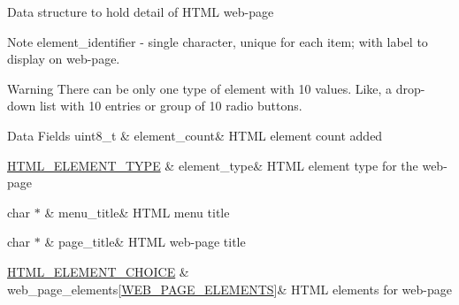 Data structure to hold detail of H\+T\+ML web-\/page \begin{DoxyNote}{Note}
element\+\_\+identifier -\/ single character, unique for each item; with label to display on web-\/page. 
\end{DoxyNote}
\begin{DoxyWarning}{Warning}
There can be only one type of element with 10 values. Like, a drop-\/down list with 10 entries or group of 10 radio buttons. 
\end{DoxyWarning}
\begin{DoxyFields}{Data Fields}
uint8\+\_\+t\hypertarget{group__wireless__interface_ab6b91b79e0ba83629806da526e4bdaae}{}\label{group__wireless__interface_ab6b91b79e0ba83629806da526e4bdaae}
&
element\+\_\+count&
H\+T\+ML element count added \\
\hline

\hyperlink{group__wireless__interface_ga2cc36b7c5f3111667d440d462542b02f}{H\+T\+M\+L\+\_\+\+E\+L\+E\+M\+E\+N\+T\+\_\+\+T\+Y\+PE}\hypertarget{group__wireless__interface_a6025538f318ab08db3e915e96eb7a1d4}{}\label{group__wireless__interface_a6025538f318ab08db3e915e96eb7a1d4}
&
element\+\_\+type&
H\+T\+ML element type for the web-\/page \\
\hline

char $\ast$\hypertarget{group__wireless__interface_a16d3b24502cc84a7ddfb6953ae9b6966}{}\label{group__wireless__interface_a16d3b24502cc84a7ddfb6953ae9b6966}
&
menu\+\_\+title&
H\+T\+ML menu title \\
\hline

char $\ast$\hypertarget{group__wireless__interface_aa7c7dcb2c3fef977f08b0843533793a3}{}\label{group__wireless__interface_aa7c7dcb2c3fef977f08b0843533793a3}
&
page\+\_\+title&
H\+T\+ML web-\/page title \\
\hline

\hyperlink{group__wireless__interface_struct_h_t_m_l___e_l_e_m_e_n_t___c_h_o_i_c_e}{H\+T\+M\+L\+\_\+\+E\+L\+E\+M\+E\+N\+T\+\_\+\+C\+H\+O\+I\+CE}\hypertarget{group__wireless__interface_a3134e7c34b2cf0d55f3577e176ddff23}{}\label{group__wireless__interface_a3134e7c34b2cf0d55f3577e176ddff23}
&
web\+\_\+page\+\_\+elements\mbox{[}\hyperlink{group__wireless__interface_ga494d4bc8995ae2fde8093a5e0f3c3936}{W\+E\+B\+\_\+\+P\+A\+G\+E\+\_\+\+E\+L\+E\+M\+E\+N\+TS}\mbox{]}&
H\+T\+ML elements for web-\/page \\
\hline

\end{DoxyFields}
\label{struct_s_o_c_k_e_t___t_a_b_l_e}
\hypertarget{group__wireless__interface_struct_s_o_c_k_e_t___t_a_b_l_e}{}
